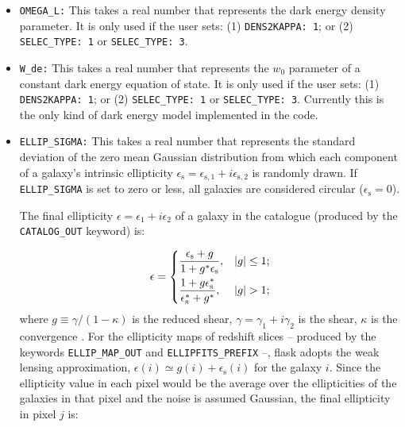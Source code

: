 \documentclass[12pt]{book} %
\newcommand{\nv}[1]{\mathrm{#1}}                 %
\begin{document}
\begin{itemize}
\item {\tt OMEGA\_L:} This takes a real number that represents the dark energy density parameter. 
  It is only used if the user sets: (1) {\tt DENS2KAPPA: 1}; or (2) {\tt SELEC\_TYPE: 1} or {\tt SELEC\_TYPE: 3}. 

\item {\tt W\_de:} This takes a real number that represents the $w_0$ parameter of a constant dark energy 
  equation of state. It is only used if the user sets: (1) {\tt DENS2KAPPA: 1}; or (2) {\tt SELEC\_TYPE: 1} 
  or {\tt SELEC\_TYPE: 3}. Currently this is the only kind of dark energy model implemented in the code. 

\item {\tt ELLIP\_SIGMA:} This takes a real number that represents the standard deviation of the zero mean 
  Gaussian distribution from which each component of a galaxy's intrinsic ellipticity 
  $\epsilon_{\nv{s}}=\epsilon_{\nv{s},1}+i\epsilon_{\nv{s},2}$ is randomly drawn. If {\tt ELLIP\_SIGMA} is 
  set to zero or less, all galaxies are considered circular ($\epsilon_{\nv{s}}=0$).

  The final ellipticity $\epsilon=\epsilon_1+i\epsilon_2$ of a galaxy in the catalogue (produced by the 
  {\tt CATALOG\_OUT} keyword) is:
  
  \begin{equation}
    \epsilon = 
    \begin{dcases}
      \frac{\epsilon_{\nv{s}}+g}{1+g^{*}\epsilon_{\nv{s}}}, & |g|\leq 1; \\
      \frac{1+g\epsilon_{\nv{s}}^{*}}{\epsilon_{\nv{s}}^{*}+g^{*}}, & |g|>1;\\
    \end{dcases}
    \label{eq:ellipticity}
  \end{equation}
  where $g\equiv \gamma/(1-\kappa)$ is the reduced shear, $\gamma=\gamma_1+i\gamma_2$ is the shear, $\kappa$ is the 
  convergence \citep[we follow ][eq. 4.12]{Bartelmann01mn}. 
  For the ellipticity maps of redshift slices -- produced by the keywords {\tt ELLIP\_MAP\_OUT} and 
  {\tt ELLIPFITS\_PREFIX} --, {\sc flask} adopts the weak lensing approximation, 
  $\epsilon(i) \simeq g(i) + \epsilon_{\nv{s}}(i)$ for the galaxy $i$. Since the ellipticity value 
  in each pixel would be the average over the ellipticities of the galaxies in that pixel 
  and the noise is assumed Gaussian, the final ellipticity in pixel $j$ is:


\end{itemize}
\end{document}
